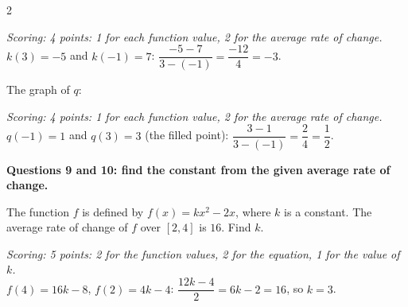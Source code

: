 \begin{multicols}{2}
\begin{minipage}{\linewidth}
\begin{exo}{}
\begin{solution}
\textit{Scoring: 4 points: 1 for each function value, 2 for the average rate of change.}\\
$k(3)=-5$ and $k(-1)=7$: $\dfrac{-5-7}{3-(-1)}=\dfrac{-12}{4}=-3$.
\end{solution}
\end{exo}
\end{minipage}\par\vspace{8pt}
\noindent\begin{minipage}{\linewidth}
\begin{exo}{}
The graph of $q$:
\ifkey\else\vspace{0.8cm}\fi
\begin{solution}
\textit{Scoring: 4 points: 1 for each function value, 2 for the average rate of change.}\\
$q(-1)=1$ and $q(3)=3$ (the filled point): $\dfrac{3-1}{3-(-1)}=\dfrac24=\dfrac12$.
\end{solution}
\end{exo}
\end{minipage}\par\vspace{8pt}
\noindent\begin{minipage}{\linewidth}
\begin{center}\textsf{\small\bfseries\color{apnavy}Questions 9 and 10: find the constant from the given average rate of change.}\end{center}
\begin{exo}{}
The function $f$ is defined by $f(x)=kx^2-2x$, where $k$ is a constant. The average rate of change of $f$ over $[2,4]$ is $16$. Find $k$.
\ifkey\else\vspace{1.6cm}\fi
\begin{solution}
\textit{Scoring: 5 points: 2 for the function values, 2 for the equation, 1 for the value of $k$.}\\
$f(4)=16k-8$, $f(2)=4k-4$: $\dfrac{12k-4}{2}=6k-2=16$, so $k=3$.
\end{solution}
\end{exo}
\end{minipage}\par\vspace{8pt}

\end{multicols}
